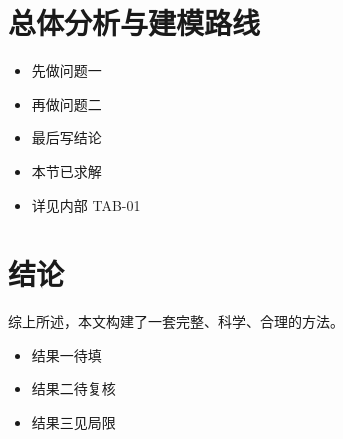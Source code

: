 
\begin{abstract}
（草稿，待全文完成后定稿。）针对问题一，本文首先建立模型；为了进一步验证模型的有效性，进一步拟合数据。T-03 与 ASM-01 仍待确认，当前拟合质量仅作初步估计。
\end{abstract}
\section{总体分析与建模路线}
\begin{itemize}
\item 先做问题一
\item 再做问题二
\item 最后写结论
\end{itemize}
\begin{itemize}
\item 本节已求解
\item 详见内部 TAB-01
\end{itemize}
\section{结论}
综上所述，本文构建了一套完整、科学、合理的方法。
\begin{itemize}
\item 结果一待填
\item 结果二待复核
\item 结果三见局限
\end{itemize}

